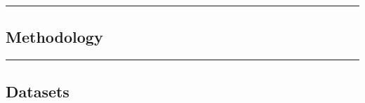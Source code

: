 {\color{gray}\hrule}
\begin{center}
\section{Methodology}

\bigskip
\end{center}
{\color{gray}\hrule}

\subsection{Datasets}
